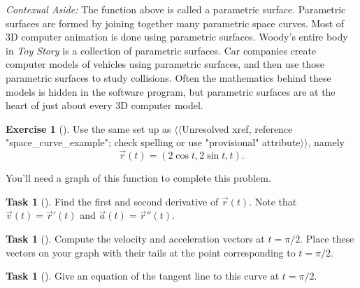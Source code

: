 \documentclass[10pt,]{book}
\theoremstyle{plain}
\theoremstyle{definition}
\theoremstyle{definition}
\theoremstyle{definition}
\theoremstyle{definition}
\newtheorem{exploration}[project]{Exercise}
\newtheorem{task}[project]{Task}
\theoremstyle{definition}
\numberwithin{equation}{section}
\begin{document}
\emph{Contexual Aside:} The function above is called a parametric surface. Parametric surfaces are formed by joining together many parametric space curves. Most of 3D computer animation is done using parametric surfaces. Woody's entire body in \emph{Toy Story} is a collection of parametric surfaces. Car companies create computer models of vehicles using parametric surfaces, and then use those parametric surfaces to study collisions. Often the mathematics behind these models is hidden in the software program, but parametric surfaces are at the heart of just about every 3D computer model.%
\begin{exploration}[]\label{exploration-107}
Use the same set up as {$\langle\langle$Unresolved xref, reference "space\_curve\_example"; check spelling or use "provisional" attribute$\rangle\rangle$}, namely%
\begin{equation*}
\vec r(t)=(2\cos t, 2\sin t, t).
\end{equation*}
%
\par
You'll need a graph of this function to complete this problem.%
\begin{task}[]\label{task-193}
Find the first and second derivative of \(\vec r(t)\). Note that \(\vec{v}(t) = \vec{r}'(t)\) and \(\vec{a}(t)=\vec{r}''(t)\).%
\end{task}
\begin{task}[]\label{task-194}
Compute the velocity and acceleration vectors at \(t=\pi/2\). Place these vectors on your graph with their tails at the point corresponding to \(t=\pi/2\).%
\end{task}
\begin{task}[]\label{task-195}
Give an equation of the tangent line to this curve at \(t=\pi/2\).%
\end{task}
\end{exploration}
\end{document}
